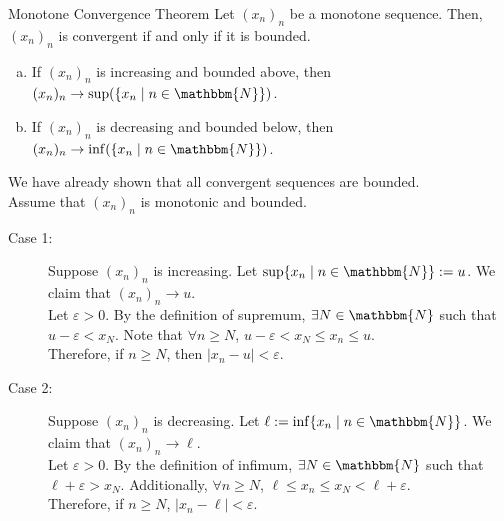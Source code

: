 \documentclass[10pt]{extarticle}
\newcommand{\N}{\mathbbm{N}}
\begin{document}
  \begin{problem}{Monotone Convergence Theorem}
    Let $(x_n)_n$ be a monotone sequence. Then, $(x_n)_n$ is convergent if and only if it is bounded.
    \begin{enumerate}[(a)]
      \item If $(x_n)_n$ is increasing and bounded above, then $(x_n)_n \rightarrow \sup(\{x_n\mid n\in\N\})$.
      \item If $(x_n)_n$ is decreasing and bounded below, then $(x_n)_n \rightarrow \inf(\{x_n\mid n\in\N\})$.
    \end{enumerate}
    \tcblower
    We have already shown that all convergent sequences are bounded.\\

    Assume that $(x_n)_n$ is monotonic and bounded.
    \begin{description}
      \item[Case 1:] Suppose $(x_n)_n$ is increasing. Let $\sup\{x_n\mid n\in\N\} := u$. We claim that $(x_n)_n \rightarrow u$.\\

        Let $\varepsilon > 0$. By the definition of supremum, $\exists N\in\N$ such that $u-\varepsilon < x_{N}$. Note that $\forall n\geq N$, $u-\varepsilon < x_N \leq x_n \leq u$.\\

        Therefore, if $n\geq N$, then $|x_n - u| < \varepsilon$.
      \item[Case 2:] Suppose $(x_n)_n$ is decreasing. Let $\ell := \inf\{x_n\mid n\in\N\}$. We claim that $(x_n)_n \rightarrow \ell$.\\

        Let $\varepsilon > 0$. By the definition of infimum, $\exists N\in\N$ such that $\ell + \varepsilon > x_N$. Additionally, $\forall n \geq N$, $\ell \leq x_n \leq x_N < \ell + \varepsilon$.\\

        Therefore, if $n \geq N$, $|x_n - \ell| < \varepsilon$.
    \end{description}
  \end{problem}
\end{document}
